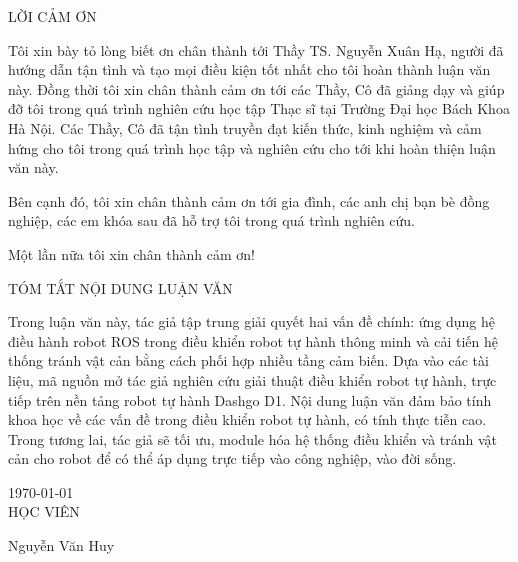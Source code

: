 \newpage
\begin{center}
    LỜI CẢM ƠN
\end{center}

Tôi xin bày tỏ lòng biết ơn chân thành tới Thầy TS. Nguyễn Xuân Hạ, người đã hướng dẫn tận tình và tạo mọi điều kiện tốt nhất cho tôi hoàn thành luận văn này. Đồng thời tôi xin chân thành cảm ơn tới các Thầy, Cô đã giảng dạy và giúp đỡ tôi trong quá trình nghiên cứu học tập Thạc sĩ tại Trường Đại học Bách Khoa Hà Nội. Các Thầy, Cô đã tận tình truyền đạt kiến thức, kinh nghiệm và cảm hứng cho tôi trong quá trình học tập và nghiên cứu cho tới khi hoàn thiện luận văn này.

Bên cạnh đó, tôi xin chân thành cảm ơn tới gia đình, các anh chị bạn bè đồng nghiệp, các em khóa sau đã hỗ trợ tôi trong quá trình nghiên cứu.

Một lần nữa tôi xin chân thành cảm ơn!

\hspace{2cm}

\begin{center}
    TÓM TẮT NỘI DUNG LUẬN VĂN
\end{center}

Trong luận văn này, tác giả tập trung giải quyết hai vấn đề chính: ứng dụng hệ điều hành robot ROS trong điều khiển robot tự hành thông minh và cải tiến hệ thống tránh vật cản bằng cách phối hợp nhiều tầng cảm biến. Dựa vào các tài liệu, mã nguồn mở tác giả nghiên cứu giải thuật điều khiển robot tự hành, trực tiếp trên nền tảng robot tự hành Dashgo D1. Nội dung luận văn đảm bảo tính khoa học về các vấn đề trong điều khiển robot tự hành, có tính thực tiễn cao. Trong tương lai, tác giả sẽ tối ưu, module hóa hệ thống điều khiển và tránh vật cản cho robot để có thể áp dụng trực tiếp vào công nghiệp, vào đời sống.

\hspace{3cm}

\hspace{7cm} \today \\

\hspace{8cm} HỌC VIÊN \\

\hspace{30pt}

\hspace{7.5cm} Nguyễn Văn Huy
